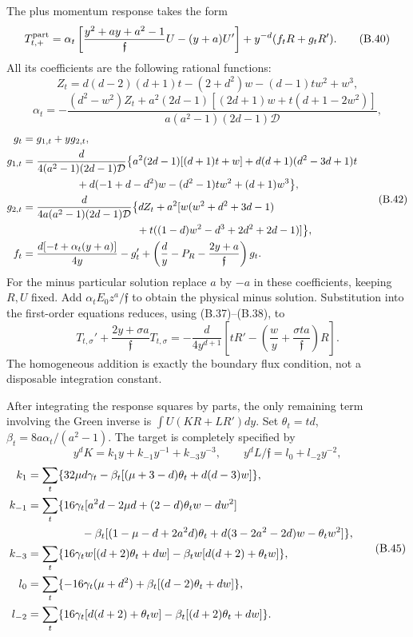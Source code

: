 The plus momentum response takes the form \[
T^{\rm part}_{t,+}
=\alpha_t\left[
\frac{y^2+ay+a^2-1}{\mathfrak f}U-(y+a)U'\right]
+y^{-d}(f_tR+g_tR').
\tag{B.40}
\] All its coefficients are the following rational functions: \[
Z_t=d(d-2)(d+1)t-(2+d^2)w-(d-1)tw^2+w^3,
\] \[
\alpha_t=
-\frac{(d^2-w^2)Z_t
+a^2(2d-1)[(2d+1)w+t(d+1-2w^2)]}
{a(a^2-1)(2d-1)\mathcal D},
\tag{B.41}
\] \[
\begin{aligned}
g_t&=g_{1,t}+yg_{2,t},\\
g_{1,t}&=\frac{d}{4(a^2-1)(2d-1)\mathcal D}
\bigl\{a^2(2d-1)[(d+1)t+w]
+d(d+1)(d^2-3d+1)t\\
&\hspace{18mm}+d(-1+d-d^2)w-(d^2-1)tw^2+(d+1)w^3\bigr\},\\
g_{2,t}&=\frac{d}{4a(a^2-1)(2d-1)\mathcal D}
\bigl\{dZ_t+a^2[w(w^2+d^2+3d-1)\\
&\hspace{38mm}+t((1-d)w^2-d^3+2d^2+2d-1)]\bigr\},\\
f_t&=\frac{d[-t+\alpha_t(y+a)]}{4y}
-g_t'+\left(\frac d y-P_R-\frac{2y+a}{\mathfrak f}\right)g_t.
\end{aligned}
\tag{B.42}
\] For the minus particular solution replace \(a\) by \(-a\) in these coefficients, keeping \(R,U\) fixed. Add \(\alpha_tE_0z^a/\mathfrak f\) to obtain the physical minus solution. Substitution into the first-order equations reduces, using (B.37)--(B.38), to \[
T_{t,\sigma}'+\frac{2y+\sigma a}{\mathfrak f}T_{t,\sigma}
=-\frac{d}{4y^{d+1}}
\left[tR'-\left(\frac wy+\frac{\sigma ta}{\mathfrak f}\right)R\right].
\tag{B.43}
\] The homogeneous addition is exactly the boundary flux condition, not a disposable integration constant.

After integrating the response squares by parts, the only remaining term involving the Green inverse is \(\int U(KR+LR')dy\). Set \(\theta_t=td\), \(\beta_t=8a\alpha_t/(a^2-1)\). The target is completely specified by \[
y^dK=k_1y+k_{-1}y^{-1}+k_{-3}y^{-3},\qquad
y^dL/\mathfrak f=l_0+l_{-2}y^{-2},
\tag{B.44}
\] \[
\begin{aligned}
k_1&=\sum_t\{32\mu d\gamma_t
-\beta_t[(\mu+3-d)\theta_t+d(d-3)w]\},\\
k_{-1}&=\sum_t\{16\gamma_t[a^2d-2\mu d+(2-d)\theta_tw-dw^2]\\
&\hspace{17mm}-\beta_t[(1-\mu-d+2a^2d)\theta_t
+d(3-2a^2-2d)w-\theta_tw^2]\},\\
k_{-3}&=\sum_t\{16\gamma_tw[(d+2)\theta_t+dw]
-\beta_tw[d(d+2)+\theta_tw]\},\\
l_0&=\sum_t\{-16\gamma_t(\mu+d^2)
+\beta_t[(d-2)\theta_t+dw]\},\\
l_{-2}&=\sum_t\{16\gamma_t[d(d+2)+\theta_tw]
-\beta_t[(d+2)\theta_t+dw]\}.
\end{aligned}
\tag{B.45}
\]

